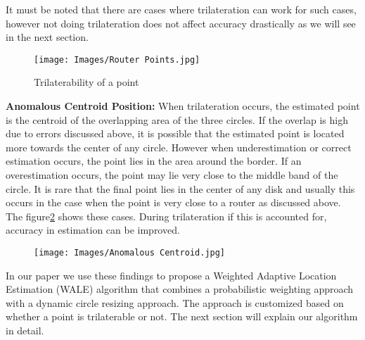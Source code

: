 It must be noted that there are cases where trilateration can work for such cases, however not doing trilateration does not affect accuracy drastically as we will see in the next section. 

\begin{figure}[ht!]
\centering
\texttt{[image: Images/Router Points.jpg]}
\caption{ Trilaterability of a point}
\label{collageofpoints}
\end{figure}


\textbf{Anomalous Centroid Position:} When trilateration occurs, the estimated point is the centroid of the overlapping area of the three circles. If the overlap is high due to errors discussed above, it is possible that the estimated point is located more towards the center of any circle. However when underestimation or correct estimation occurs, the point lies in the area around the border. If an overestimation occurs, the point may lie very close to the middle band of the circle. It is rare that the final point lies in the center of any disk and usually this occurs in the case when the point is very close to a router as discussed above. The figure\ref{collageofpoints1} shows these cases. During trilateration if this is accounted for, accuracy in estimation can be improved. 


\begin{figure}[ht!]
\centering
\texttt{[image: Images/Anomalous Centroid.jpg]}
\caption{  }
\label{collageofpoints1}
\end{figure}

In our paper we use these findings to propose a Weighted Adaptive Location Estimation (WALE) algorithm that combines a probabilistic weighting approach with a dynamic circle resizing approach. The approach is customized based on whether a point is trilaterable or not. The next section will explain our algorithm in detail. 
